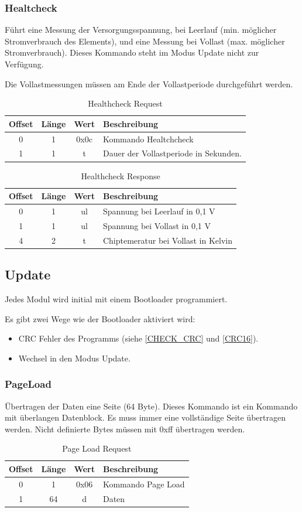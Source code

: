 \documentclass[10pt,a4paper]{article}
\begin{document}
\subsubsection{Healtcheck}
\label{sec:Healthcheck}
Führt eine Messung der Versorgungsspannung, bei Leerlauf (min. möglicher Stromverbrauch des Elements), und eine Messung bei Vollast (max. möglicher Stromverbrauch). Dieses Kommando steht im Modus Update nicht zur Verfügung.

Die Vollastmessungen müssen am Ende der Vollastperiode durchgeführt werden.
\begin{table}[H]
\centering
\begin{tabular}{c|c|c|l}
\textbf{Offset} & \textbf{Länge} & \textbf{Wert} & \textbf{Beschreibung} \\ \hline
0 & 1 & 0x0c & Kommando Healtchcheck \\
1 & 1 & t & Dauer der Vollastperiode in Sekunden.
\end{tabular}
\caption{Healthcheck Request}
\end{table}
\begin{table}[H]
\centering
\begin{tabular}{c|c|c|l}
\textbf{Offset} & \textbf{Länge} & \textbf{Wert} & \textbf{Beschreibung} \\ \hline
0 & 1 & ul & Spannung bei Leerlauf in 0,1 V\\
1 & 1 & ul & Spannung bei Vollast in 0,1 V\\
4 & 2 & t & Chiptemeratur bei Vollast in Kelvin
\end{tabular}
\caption{Healthcheck Response}
\end{table}


\subsection{Update}
Jedes Modul wird initial mit einem Bootloader programmiert.

Es gibt zwei Wege wie der Bootloader aktiviert wird:
\begin{itemize}
 \item CRC Fehler des Programms (siehe \ref{CHECK_CRC} und \ref{CRC16}).
 \item Wechsel in den Modus Update. 
\end{itemize}
  
\subsubsection{PageLoad}
\label{sec:PageLoad}
Übertragen der Daten eine Seite (64 Byte). Dieses Kommando ist ein Kommando mit überlangen Datenblock. Es muss immer eine vollständige Seite übertragen werden. Nicht definierte Bytes müssen mit 0xff übertragen werden.
\begin{table}[H]
\centering
\begin{tabular}{c|c|c|l}
\textbf{Offset} & \textbf{Länge} & \textbf{Wert} & \textbf{Beschreibung} \\ \hline
0 & 1 & 0x06 & Kommando Page Load\\
1 & 64 & d & Daten
\end{tabular}
\caption{Page Load Request}
\end{table}
\end{document}
